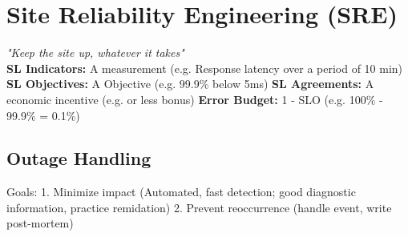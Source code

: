 \section{Site Reliability Engineering (SRE)}
\textit{"Keep the site up, whatever it takes"} \\
\textbf{SL Indicators:} A measurement (e.g. Response latency over a period of 10 min)
\textbf{SL Objectives:} A Objective (e.g. 99.9\% below 5ms)
\textbf{SL Agreements:} A economic incentive (e.g. or less bonus)
\textbf{Error Budget:} 1 - SLO (e.g. 100\% - 99.9\% = 0.1\%)

\subsection{Outage Handling}
Goals: 1. Minimize impact (Automated, fast detection; good diagnostic information, practice remidation) 2. Prevent reoccurrence (handle event, write post-mortem)

